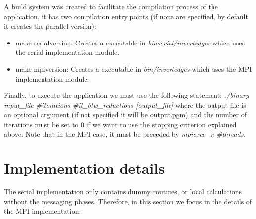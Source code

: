 \documentclass[12pt, a4paper, oneside]{article}
\begin{document}
A build system was created to facilitate the compilation process of the application, it has two compilation entry points
(if none are specified, by default it creates the parallel version):
\begin{itemize}
    \item make serialversion: Creates a executable in \emph{binserial/invertedges} which uses the serial implementation module.
    \item make mpiversion: Creates a executable in \emph{bin/invertedges} which uses the MPI implementation module.
\end{itemize}

Finally, to execute the application we must use the following statement:
\emph{./binary input\_file \#iterations \#it\_btw\_reductions [output\_file]}
where the output file is an optional argument (if not specified it will be output.pgm) and the number of iterations must be set to 0 if we want to use the stopping criterion explained above. 
Note that in the MPI case, it must be preceded by \emph{mpiexec -n \#threads}.

\section{Implementation details}
The serial implementation only contains dummy routines, or local calculations without the messaging phases. Therefore, in this section we focus in the details of the MPI implementation.
\end{document}
